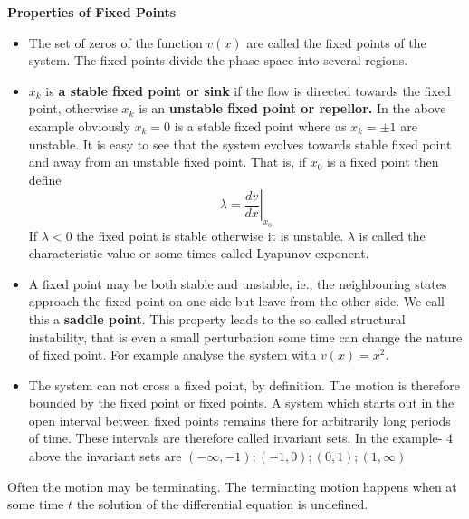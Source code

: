 \textbf{ Properties of Fixed Points}
\begin{itemize}
	\item  The set of zeros of the function $v(x)$ are called the fixed points of the system. The fixed points divide the phase space into several regions.
	\item $x_{k}$ is \textbf{a stable fixed point or sink} if the flow is directed towards the fixed point, otherwise $x_{k}$ is an \textbf{unstable fixed point or repellor.} In the above example obviously $x_{k}=0$ is a stable fixed point where as $x_{k}=\pm 1$ are unstable. It is easy to see that the system evolves towards stable fixed point and away from an unstable fixed point. That is, if $x_{0}$ is a fixed point then define
	$$
	\lambda=\left.\frac{d v}{d x}\right|_{x_{0}}
	$$
	If $\lambda<0$ the fixed point is stable otherwise it is unstable. $\lambda$ is called the characteristic value or some times called Lyapunov exponent.
	\item A fixed point may be both stable and unstable, ie., the neighbouring states approach the fixed point on one side but leave from the other side. We call this a \textbf{saddle point}. This property leads to the so called structural instability, that is even a small perturbation some time can change the nature of fixed point. For example analyse the system with $v(x)=x^{2}$.
	\item The system can not cross a fixed point, by definition. The motion is therefore bounded by the fixed point or fixed points. A system which starts out in the open interval between fixed points remains there for arbitrarily long periods of time. These intervals are therefore called invariant sets. In the example- 4 above the invariant sets are $(-\infty,-1) ;(-1,0) ;(0,1) ;(1, \infty)$
\end{itemize}
Often the motion may be terminating. The terminating motion happens when at some time $t$ the solution of the differential equation is undefined.
